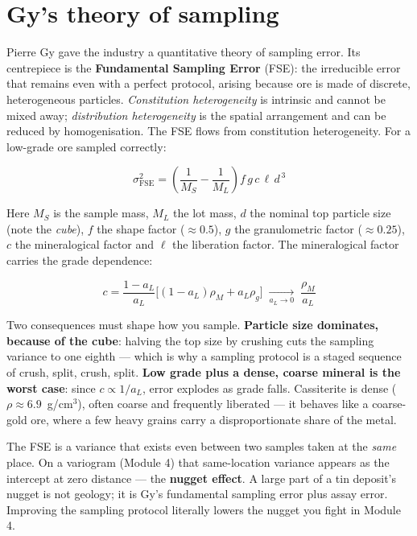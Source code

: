 \documentclass[11pt]{article}
\begin{document}
\section{Gy's theory of sampling}

Pierre Gy gave the industry a quantitative theory of sampling error. Its
centrepiece is the \textbf{Fundamental Sampling Error} (FSE): the
irreducible error that remains even with a perfect protocol, arising
because ore is made of discrete, heterogeneous particles.
\emph{Constitution heterogeneity} is intrinsic and cannot be mixed away;
\emph{distribution heterogeneity} is the spatial arrangement and can be
reduced by homogenisation. The FSE flows from constitution heterogeneity.
For a low-grade ore sampled correctly:

\begin{eqbox}
\[ \sigma^2_{\text{FSE}} = \left(\frac{1}{M_S}-\frac{1}{M_L}\right)
   f\,g\,c\,\ell\,d^{\,3} \tag{2.2}\]
\end{eqbox}

Here $M_S$ is the sample mass, $M_L$ the lot mass, $d$ the nominal top
particle size (note the \emph{cube}), $f$ the shape factor ($\approx
0.5$), $g$ the granulometric factor ($\approx 0.25$), $c$ the
mineralogical factor and $\ell$ the liberation factor. The mineralogical
factor carries the grade dependence:

\begin{eqbox}
\[ c = \frac{1-a_L}{a_L}\big[(1-a_L)\rho_M + a_L\rho_g\big]
   \;\xrightarrow[a_L\to 0]{}\; \frac{\rho_M}{a_L} \tag{2.3}\]
\end{eqbox}

Two consequences must shape how you sample. \textbf{Particle size
dominates, because of the cube}: halving the top size by crushing cuts
the sampling variance to one eighth --- which is why a sampling protocol
is a staged sequence of crush, split, crush, split. \textbf{Low grade
plus a dense, coarse mineral is the worst case}: since $c \propto 1/a_L$,
error explodes as grade falls. Cassiterite is dense
($\rho\approx6.9$~g/cm$^3$), often coarse and frequently liberated --- it
behaves like a coarse-gold ore, where a few heavy grains carry a
disproportionate share of the metal.

\begin{notebox}
The FSE is a variance that exists even between two samples taken at the
\emph{same} place. On a variogram (Module 4) that same-location variance
appears as the intercept at zero distance --- the \textbf{nugget
effect}. A large part of a tin deposit's nugget is not geology; it is
Gy's fundamental sampling error plus assay error. Improving the sampling
protocol literally lowers the nugget you fight in Module 4.
\end{notebox}
\end{document}

